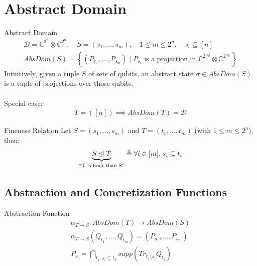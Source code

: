 \documentclass[11pt,svgnames,smaller,aspectratio=43,english]{beamer}
\makeatletter
\newcommand{\tensor}{\otimes}
\newcommand{\bunder}[2]{\underbrace{#1}_{\text{\scriptsize\tabular[t]{@{}c@{}}#2\endtabular}}}
\makeatother
\begin{document}
\section{Abstract Domain}
\begin{frame}{Abstract Domain}
	\begin{gather*}
	\mathcal{D} = \mathbb{C}^{2^n}\tensor\mathbb{C}^{2^n},\quad S = (s_1, ..., s_m),\quad 1 \leq m \leq 2^n,\quad s_i \subseteq [n]\\
		\mathit{AbsDom}(S) = \left\{(P_{s_1}, ..., P_{s_m}) \mid P_{s_i} \text{ is a projection in } \mathbb{C}^{2^{|s_i|}}\tensor\mathbb{C}^{2^{|s_i|}}\right\}
	\end{gather*}
	Intuitively, given a tuple $S$ of sets of qubits, an abstract state $\overline{\sigma} \in \mathit{AbsDom}(S)$ is a tuple of projections over those qubits.\\\;\\
	{\color{blue} Special case:}
	\begin{gather*}
		T = ([n]) \implies \mathit{AbsDom}(T) = \mathcal{D}
	\end{gather*}
\end{frame}

\begin{frame}{Fineness Relation}
	Let $S = (s_1, ..., s_m)$ and $T = (t_1, ..., t_m)$ (with $1 \leq m \leq 2^n$), then:
	\begin{equation*}
		\bunder{S \trianglelefteq T}{``T is finer than S''} \triangleq \forall i \in [m].\; s_i \subseteq t_i
	\end{equation*}
\end{frame}

\subsection{Abstraction and Concretization Functions}
\begin{frame}{Abstraction Function}
	\begin{gather*}
		\alpha_{T \rightarrow S}: \mathit{AbsDom}(T) \rightarrow \mathit{AbsDom}(S)\\
		\alpha_{T \rightarrow S}(Q_{t_1}, ..., Q_{t_{m}}) = (P_{s_1}, ..., P_{s_m})\\
		P_{s_i} = \bigcap_{t_j.\; s_i \subseteq t_J} supp(Tr_{t_j \setminus s_i} Q_{t_j})
	\end{gather*}
\end{frame}


\end{document}
